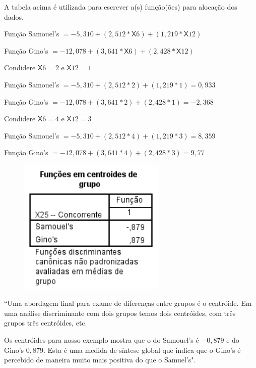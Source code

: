 				A tabela acima é utilizada para escrever a(s) função(ões) para alocação dos dados.

				\bigskip

				{\Large Função Samouel's $= -5,310 + (2,512 * \mathsf{X}6) + (1,219 * \mathsf{X}12)$}

				\bigskip

				{\Large Função Gino's $= -12,078 + (3,641 * \mathsf{X}6) + (2,428 * \mathsf{X}12)$}

				\bigskip

				Condidere $\mathsf{X}6 = 2$ e  $\mathsf{X}12 = 1$

				\bigskip

				Função Samouel's $= -5,310 + (2,512 * 2) + (1,219 * 1) = 0,933$
				
				Função Gino's $= -12,078 + (3,641 * 2) + (2,428 * 1) = -2,368$

				\bigskip

				Condidere $\mathsf{X}6 = 4$ e  $\mathsf{X}12 = 3$

				\bigskip

				Função Samouel's $= -5,310 + (2,512 * 4) + (1,219 * 3) = 8,359$
				
				Função Gino's $= -12,078 + (3,641 * 4) + (2,428 * 3) = 9,77$

				\begin{figure}[H]
					\centering
					\includegraphics[height=6.5cm]{images/analise-discriminante_centroides-de-grupo}
				\end{figure}

				``Uma abordagem final para exame de diferenças entre grupos é o centróide. Em uma análise discriminante com dois grupos temos dois centróides, com três grupos três centróides, etc.

				Os centróides para nosso exemplo mostra que o do Samouel’s é $-0,879$ e do Gino’s $0,879$. Esta é uma medida de síntese global que indica que o Gino’s é percebido de maneira muito mais positiva do que o Samuel’s".


